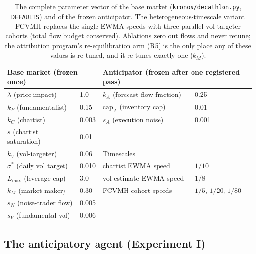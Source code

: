 \documentclass[11pt]{article}
\newcommand{\cfg}[1]{\mbox{#1}}
\begin{document}
\begin{table}[t]
\centering\small
\begin{tabular}{llll}
\toprule
\multicolumn{2}{l}{Base market (frozen once)} &
\multicolumn{2}{l}{Anticipator (frozen after one registered pass)} \\
\midrule
$\lambda$ (price impact)      & 1.0    & $k_A$ (forecast-flow fraction) & 0.25 \\
$k_F$ (fundamentalist)        & 0.15   & $\mathrm{cap}_A$ (inventory cap) & 0.01 \\
$k_C$ (chartist)              & 0.003  & $s_A$ (execution noise) & 0.001 \\
$s$ (chartist saturation)     & 0.01   & & \\
$k_V$ (vol-targeter)          & 0.06   & \multicolumn{2}{l}{Timescales} \\
$\sigma^{*}$ (daily vol target) & 0.010 & chartist EWMA speed & $1/10$ \\
$L_{\max}$ (leverage cap)     & 3.0    & vol-estimate EWMA speed & $1/8$ \\
$k_M$ (market maker)          & 0.30   & \cfg{FCVMH} cohort speeds & $1/5,\,1/20,\,1/80$ \\
$s_N$ (noise-trader flow)     & 0.005  & & \\
$s_V$ (fundamental vol)       & 0.006  & & \\
\bottomrule
\end{tabular}
\caption{The complete parameter vector of the base market
(\texttt{kronos/decathlon.py}, \texttt{DEFAULTS}) and of the frozen
anticipator. The heterogeneous-timescale variant \cfg{FCVMH} replaces the
single EWMA speeds with three parallel vol-targeter cohorts (total flow
budget conserved). Ablations zero out flows and never retune; the
attribution program's re-equilibration arm (R5) is the only place any of
these values is re-tuned, and it re-tunes exactly one ($k_M$).}
\label{tab:params}
\end{table}

\subsection{The anticipatory agent (Experiment I)}
\label{sec:model:anticipator}
\end{document}
